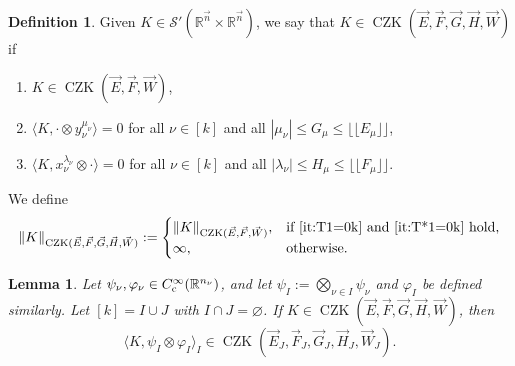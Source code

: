 \documentclass[11pt, reqno]{amsart}
\newtheorem{lemma}[theorem]{Lemma}
\theoremstyle{definition}
\newtheorem{definition}[theorem]{Definition}
\theoremstyle{remark}
\numberwithin{equation}{section}
\newcommand{\vE}{\vec E}
\newcommand{\vF}{\vec F}
\newcommand{\R}{\mathbb R}
\newcommand{\vn}{\vec n}
\newcommand{\Floor}[1]{\lfloor\!\lfloor #1 \rfloor\!\rfloor}
\newcommand{\pair}[2]{\langle #1, #2 \rangle}
\newcommand{\abs}[1]{|#1|}
\newcommand{\Norm}[2]{\|#1\|_{#2}}
\begin{document}
\begin{definition}\label{def:CZEFGHk}
Given $K\in\mathscr S'(\R^{\vn}\times\R^{\vn})$, we say that $K\in\operatorname{CZK}(\vE,\vF,\vec G,\vec H,\vec W)$ if
\begin{enumerate}[\rm(i)]
  \item $K\in\operatorname{CZK}(\vE,\vF,\vec W)$,
  \item\label{it:T1=0k} $\pair{K}{\cdot\otimes y_\nu^{\mu_\nu}}=0$ for all $\nu\in[k]$ and all $\abs{\mu_\nu}\leq G_\mu\leq\Floor{E_\mu}$,
  \item\label{it:T*1=0k} $\pair{K}{x_\nu^{\lambda_\nu}\otimes\cdot}=0$ for all $\nu\in[k]$ and all $\abs{\lambda_\nu}\leq H_\mu\leq\Floor{F_\mu}$.
\end{enumerate}
We define
\begin{equation*}
  \Norm{K}{\operatorname{CZK}(\vE,\vF,\vec G,\vec H,\vec W)}:=
  \begin{cases}   \Norm{K}{\operatorname{CZK}(\vE,\vF,\vec W)}, & \text{if \eqref{it:T1=0k} and \eqref{it:T*1=0k} hold}, \\
  \infty, & \text{otherwise}. \end{cases}
\end{equation*}
\end{definition}

\begin{lemma}\label{lem:T1=0rest}
Let $\psi_\nu,\varphi_\nu\in C_{\rm c}^\infty(\R^{n_\nu})$,
and let $\psi_I:=\bigotimes_{\nu\in I}\psi_\nu$ and $\varphi_I$ be defined similarly. Let $[k]=I\cup J$ with $I\cap J=\varnothing$. If $K\in \operatorname{CZK}(\vE,\vF,\vec G,\vec H,\vec W)$, then
\begin{equation*}
  \pair{K}{\psi_I\otimes\varphi_I}_I\in\operatorname{CZK}(\vE_J,\vF_J,\vec G_J,\vec H_J,\vec W_J).
\end{equation*}
\end{lemma}
\end{document}
